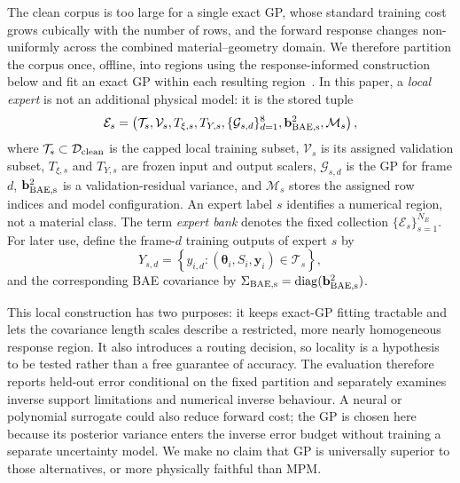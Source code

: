 The clean corpus is too large for a single exact GP, whose standard
training cost grows cubically with the number of rows, and the forward
response changes non-uniformly across the combined material--geometry
domain.  We therefore partition the corpus once, offline, into regions
using the response-informed construction below and fit an exact GP
within each resulting region~\cite{nguyen2008local}.
In this paper, a \emph{local expert} is not an additional physical model:
it is the stored tuple
\begin{equation}
\label{eq:expert-definition}
  \mathcal{E}_s=
  \left(\mathcal{T}_s,\mathcal{V}_s,T_{\xi,s},T_{Y,s},
  \{\mathcal{G}_{s,d}\}_{d=1}^{8},
  \mathbf b^{2}_{\rm BAE,s},\mathcal{M}_s\right),
\end{equation}
where $\mathcal{T}_s\subset\mathcal{D}_{\rm clean}$ is the capped local
training subset, $\mathcal{V}_s$ is its assigned validation subset,
$T_{\xi,s}$ and $T_{Y,s}$ are frozen input and output scalers,
$\mathcal{G}_{s,d}$ is the GP for frame $d$,
$\mathbf b^{2}_{\rm BAE,s}$ is a validation-residual variance,
and $\mathcal{M}_s$ stores the assigned row indices and model configuration.
An expert label $s$ identifies a numerical region, not a material class.  The
term \emph{expert bank} denotes the fixed collection
$\{\mathcal{E}_s\}_{s=1}^{N_E}$.
For later use, define the frame-$d$ training outputs of expert $s$ by
\begin{equation}
  Y_{s,d}
  =\left\{y_{i,d}:
  (\boldsymbol{\theta}_i,S_i,\mathbf{y}_i)\in\mathcal{T}_s\right\},
\end{equation}
and the corresponding BAE covariance by
$\Sigma_{\rm BAE,s}=\mathrm{diag}
(\mathbf b^{2}_{\rm BAE,s})$.

This local construction has two purposes: it keeps exact-GP fitting
tractable and lets the covariance length scales describe a restricted,
more nearly homogeneous response region.  It also introduces a routing
decision, so locality is a hypothesis to be tested rather than a free
guarantee of accuracy.  The evaluation therefore reports held-out error
conditional on the fixed partition and separately examines inverse
support limitations and numerical inverse behaviour.
A neural or polynomial surrogate could also reduce forward cost; the GP
is chosen here because its posterior variance enters the inverse error
budget without training a separate uncertainty model.  We make no claim
that GP is universally superior to those alternatives, or more
physically faithful than MPM.

